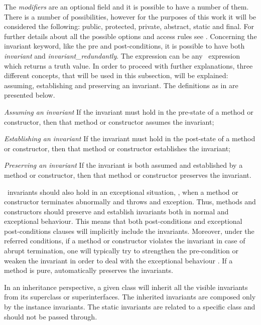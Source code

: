 The \textit{modifiers} are an optional field and it is possible to have a number of them. There is a number of possibilities, however for the purposes of this work it will be considered the following: public, protected, private, abstract, static and final. For further details about all the possible options and access rules see \cite{leavens-etal07}. Concerning the invariant keyword, like the pre and post-conditions, it is possible to have both \textit{invariant} and \textit{invariant\_redundantly}. The expression can be any \jml\ expression which returns a truth value. In order to proceed with further explanations, three different concepts, that will be used in this subsection, will be explained: assuming, establishing and preserving an invariant. The definitions as in \cite{leavens-etal07} are presented below.
\begin{description}
\item{\textit{Assuming an invariant}} If the invariant must hold in the pre-state of a method or constructor, then that method or constructor assumes the invariant;
\item{\textit{Establishing an invariant}} If the invariant must hold in the post-state of a method or constructor, then that method or constructor establishes the invariant;
\item{\textit{Preserving an invariant}} If the invariant is both assumed and established by a method or constructor, then that method or constructor preserves the invariant.
\end{description}
\jml\ invariants should also hold in an exceptional situation, \ie, when a method or constructor terminates abnormally and throws and exception. Thus, methods and constructors should preserve and establish invariants both in normal and exceptional behaviour. This means that both post-conditions and exceptional post-conditions clauses will implicitly include the invariants. Moreover, under the referred conditions, if a method or constructor violates the invariant in case of abrupt termination, one will typically try to strengthen the pre-condition or weaken the invariant in order to deal with the exceptional behaviour \cite{leavens-etal07}. If a method is pure, automatically preserves the invariants.

In an inheritance perspective, a given class will inherit all the visible invariants from its superclass or superinterfaces. The inherited invariants are composed only by the instance invariants. The static invariants are related to a specific class and should not be passed through. 

